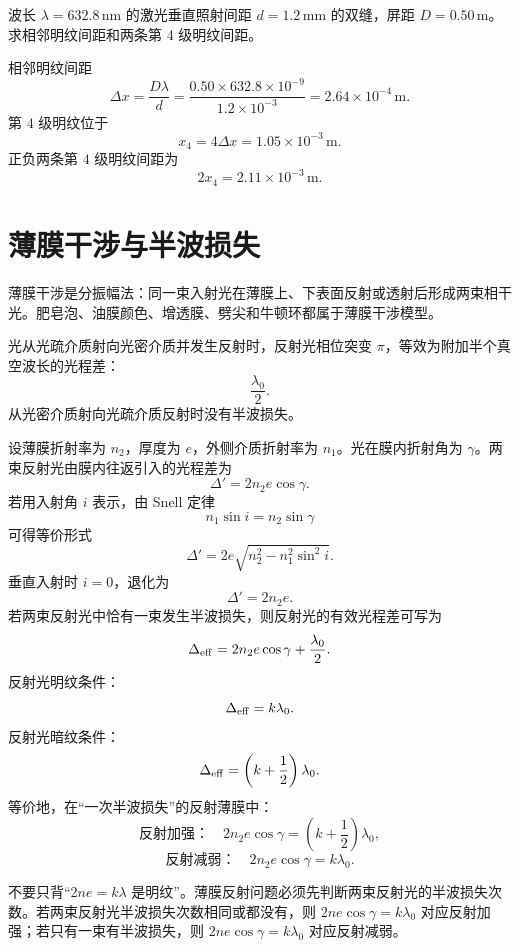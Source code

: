 \begin{example}[title={双缝明纹间距}]\label{eg:young-example}
波长 $\lambda=632.8\,\mathrm{nm}$ 的激光垂直照射间距 $d=1.2\,\mathrm{mm}$ 的双缝，屏距 $D=0.50\,\mathrm{m}$。求相邻明纹间距和两条第 $4$ 级明纹间距。

\begin{solution}
相邻明纹间距
\[
  \Delta x=\frac{D\lambda}{d}
  =\frac{0.50\times632.8\times10^{-9}}{1.2\times10^{-3}}
  =2.64\times10^{-4}\,\mathrm{m}.
\]
第 $4$ 级明纹位于
\[
  x_4=4\Delta x=1.05\times10^{-3}\,\mathrm{m}.
\]
正负两条第 $4$ 级明纹间距为
\[
  2x_4=2.11\times10^{-3}\,\mathrm{m}.
\]
\end{solution}
\end{example}

\section{薄膜干涉与半波损失}

薄膜干涉是分振幅法：同一束入射光在薄膜上、下表面反射或透射后形成两束相干光。肥皂泡、油膜颜色、增透膜、劈尖和牛顿环都属于薄膜干涉模型。


\begin{definition}[半波损失]\label{def:half-wave-loss}
光从光疏介质射向光密介质并发生反射时，反射光相位突变 $\pi$，等效为附加半个真空波长的光程差：
\[
  \frac{\lambda_0}{2}.
\]
从光密介质射向光疏介质反射时没有半波损失。
\end{definition}

设薄膜折射率为 $n_2$，厚度为 $e$，外侧介质折射率为 $n_1$。光在膜内折射角为 $\gamma$。两束反射光由膜内往返引入的光程差为
\[
  \Delta'=2n_2e\cos\gamma.
\]
若用入射角 $i$ 表示，由 Snell 定律
\[
  n_1\sin i=n_2\sin\gamma
\]
可得等价形式
\[
  \Delta'=2e\sqrt{n_2^2-n_1^2\sin^2 i}.
\]
垂直入射时 $i=0$，退化为
\[
  \Delta'=2n_2e.
\]
若两束反射光中恰有一束发生半波损失，则反射光的有效光程差可写为
\[
  \Delta_{\rm eff}=2n_2e\cos\gamma+\frac{\lambda_0}{2}.
\]
反射光明纹条件：
\[
  \Delta_{\rm eff}=k\lambda_0.
\]
反射光暗纹条件：
\[
  \Delta_{\rm eff}=\left(k+\frac12\right)\lambda_0.
\]
等价地，在“一次半波损失”的反射薄膜中：
\[
  \text{反射加强：}\quad 2n_2e\cos\gamma=\left(k+\frac12\right)\lambda_0,
\]
\[
  \text{反射减弱：}\quad 2n_2e\cos\gamma=k\lambda_0.
\]

\begin{pitfall}[薄膜明暗条件会因半波损失反转]
不要只背“$2ne=k\lambda$ 是明纹”。薄膜反射问题必须先判断两束反射光的半波损失次数。若两束反射光半波损失次数相同或都没有，则 $2ne\cos\gamma=k\lambda_0$ 对应反射加强；若只有一束有半波损失，则 $2ne\cos\gamma=k\lambda_0$ 对应反射减弱。
\end{pitfall}

